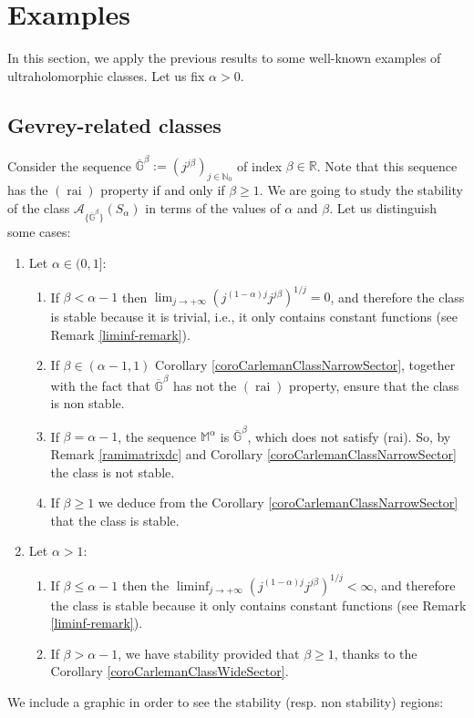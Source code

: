 \documentclass[11pt,a4paper]{article}
\theoremstyle{plain}
\theoremstyle{definition}
\newcommand{\RR}{\mathbb{R}}
\newcommand{\NN}{\mathbb{N}}
\newcommand{\M}{\mathbb{M}}
\newcommand{\G}{\mathbb{G}}
\let\on=\operatorname
\begin{document}
\section{Examples}\label{sect.Examples}
{In this section, we apply the previous results to some well-known examples of ultraholomorphic classes. Let us fix $\alpha>0$.

\subsection{Gevrey-related classes}

Consider the sequence $\overline{\G}^\beta:=(j^{j\beta})_{j\in\NN_0}$ of index $\beta\in\RR$. Note that this sequence has the \hyperlink{rai}{$(\on{rai})$} property if and only if $\beta\geq1$. We are going to study the stability of the class $\mathcal{A}_{\{\overline{\G}^\beta\}}(S_{\alpha})$ in terms of the values of $\alpha$ and $\beta$. Let us distinguish some cases:

\begin{enumerate}
	\item[(a)] Let $\alpha\in(0,1]$:
				\begin{enumerate}
					\item[(i)] If $\beta<\alpha-1$ then  $\lim_{j\rightarrow+\infty}(j^{(1-\alpha)j}j^{j\beta})^{1/j}=0$, and therefore the class is stable because it is trivial, i.e., it only contains constant functions (see Remark \ref{liminf-remark}).
					\item[(ii)] If $\beta\in(\alpha-1,1)$ Corollary \ref{coroCarlemanClassNarrowSector}, together with the fact that $\overline{\G}^\beta$ has not the \hyperlink{rai}{$(\on{rai})$} property, ensure that the class is non stable.
					\item[(iii)] If $\beta=\alpha-1$, the sequence $\M^{\alpha}$ is $\overline{\G}^\beta$, which does not satisfy (rai). So, by Remark \ref{ramimatrixdc} and Corollary \ref{coroCarlemanClassNarrowSector} the class is not stable.
					\item[(iv)] If $\beta\geq1$ we deduce from the Corollary \ref{coroCarlemanClassNarrowSector} that the class is stable.
				\end{enumerate}
	\item[(b)] Let $\alpha>1$:
				\begin{enumerate}
					\item[(i)] If $\beta\leq\alpha-1$ then the $\liminf_{j\rightarrow+\infty}(j^{(1-\alpha)j}j^{j\beta})^{1/j}<\infty$, and therefore the class is stable because it only contains constant functions (see Remark \ref{liminf-remark}).
					\item[(ii)] If $\beta>\alpha-1$, we have stability provided that $\beta\geq1$, thanks to the Corollary \ref{coroCarlemanClassWideSector}.
				\end{enumerate}
\end{enumerate}
We include a graphic in order to see the stability (resp. non stability) regions:
}
\end{document}
